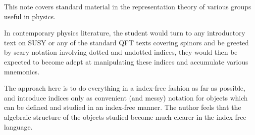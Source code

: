 This note covers standard material in the representation theory of various groups useful in physics.

In contemporary physics literature, the student would turn to any introductory text on SUSY or any of the standard QFT texts covering spinors and be greeted by scary notation involving dotted and undotted indices, they would then be expected to become adept at manipulating these indices and accumulate various mnemonics.

The approach here is to do everything in a index-free fashion as far as possible, and introduce indices only as convenient (and messy) notation for objects which can be defined and studied in an index-free manner. The author feels that the algebraic structure of the objects studied become much clearer in the index-free language.
